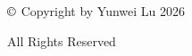 

\begin{center}
\vspace*{5cm}
$\copyright$ Copyright by Yunwei Lu 2026

All Rights Reserved

\end{center}